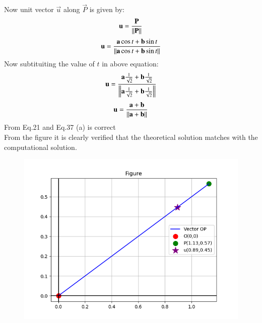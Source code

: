 \documentclass[journal]{IEEEtran}
\theoremstyle{remark}
\begin{document}
Now unit vector $\Vec{u}$ along $\Vec{P}$ is given by:
\begin{align}
    \Vec{{\Vec{u}}}=\frac{\Vec{P}}{\norm{\Vec{P}}}
\end{align}
\begin{align}
\Vec{\Vec{u}}=\frac{\vec{a}\cos{t} + \vec{b}\sin{t}}{\norm{\vec{a}\cos{t} + \vec{b}\sin{t}}}
\end{align}
Now subtituiting the value of $t$ in above equation:
\begin{align}
    \Vec{u}=\frac{\Vec{a}\frac{1}{\sqrt{2}} + \Vec{b}\frac{1}{\sqrt{2}}}{\norm{\Vec{a}\frac{1}{\sqrt{2}} + \Vec{b}\frac{1}{\sqrt{2}}}}
\end{align}
\begin{align}
    \Vec{u}=\frac{\Vec{a} + \Vec{b}}{\norm{\Vec{a} + \Vec{b}}}
\end{align}
From Eq.21 and Eq.37 (a) is correct\\
From the figure it is clearly verified that the theoretical solution matches with the computational solution.\\
\begin{figure}[h]
    \centering
    \includegraphics[height=0.5\textheight, keepaspectratio]{figs/figure1.png}
    \label{figure_1}
\end{figure}
\end{document}
